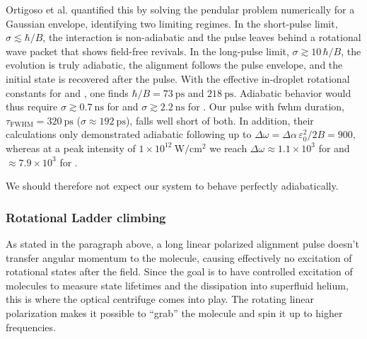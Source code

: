 Ortigoso et al. quantified this by solving the pendular problem numerically for a Gaussian envelope, identifying two limiting regimes. In the short-pulse limit, $\sigma\lesssim\hbar/B$, the interaction is non-adiabatic and the pulse leaves behind a rotational wave packet that shows field-free revivals. In the long-pulse limit, $\sigma\gtrsim10\,\hbar/B$, the evolution is truly adiabatic, the alignment follows the pulse envelope, and the initial state is recovered after the pulse.
With the effective in-droplet rotational constants for \OCS and \CSS, one finds $\hbar/B=73\ \mathrm{ps}$ and $218\ \mathrm{ps}$. Adiabatic behavior would thus require $\sigma\gtrsim0.7\ \mathrm{ns}$ for \OCS and $\sigma\gtrsim2.2\ \mathrm{ns}$ for \CSS. Our pulse with \gls{fwhm} duration, $\tau_{\mathrm{FWHM}}=320\ \mathrm{ps}$ ($\sigma\approx192\ \mathrm{ps}$), falls well short of both. In addition, their calculations only demonstrated adiabatic following up to $\Delta\omega=\Delta\alpha\,\varepsilon_{0}^{2}/2B=900$, whereas at a peak intensity of $1\times10^{12}\ \mathrm{W/cm^{2}}$ we reach $\Delta\omega\approx1.1\times10^{3}$ for \OCS and $\approx7.9\times10^{3}$ for \CSS.

We should therefore not expect our system to behave perfectly adiabatically.

\subsubsection{Rotational Ladder climbing}

As stated in the paragraph above, a long linear polarized alignment pulse doesn't transfer angular momentum to the molecule, causing effectively no excitation of rotational states after the field. Since the goal is to have controlled excitation of molecules to measure state lifetimes and the dissipation into superfluid helium, this is where the optical centrifuge comes into play. The rotating linear polarization makes it possible to ``grab'' the molecule and spin it up to higher frequencies. 

